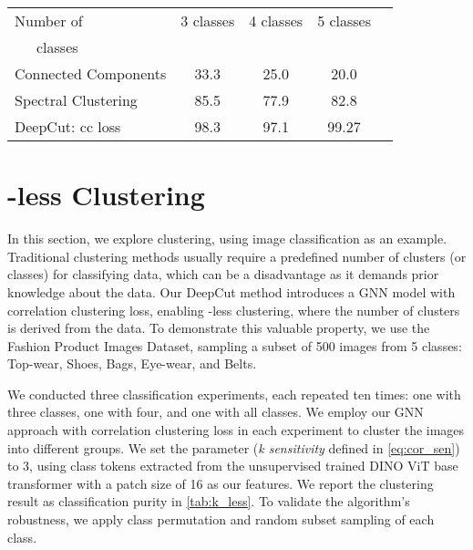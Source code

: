 \documentclass[10pt,twocolumn,letterpaper]{article}
\begin{document}
 \begin{table*}
  \centering
  \begin{tabular}{@{}l c c c c @{}}
    \toprule
    Number  of& 3 classes &4 classes&5 classes&\\
     \ \ \ classes  &                 &   \\

    \midrule
    Connected Components  & 33.3  & 25.0  & 20.0 \\
    Spectral Clustering& 85.5  & 77.9  & 82.8  \\
    DeepCut: cc loss& 98.3   & 97.1  & 99.27   \\

    \bottomrule
  \end{tabular}
  \caption{\textbf{-less clustering.} We apply DeepCut with correlation clustering loss on the Fashion Product Images Dataset\cite{Fashion_dataset}, using a subset of images from 5 classes: Top-wear, Shoes, Bags, Eye-wear, and Belts. We employ our -less method and report the results as classification purity. The experiments are conducted with \emph{k sensitivity = 3} as defined in \cref{eq:cor_sen}. The presented results are the mean and standard deviation (\emph{std}) obtained from multiple experiments.
  }
  \label{tab:k_less}
\end{table*}




\section{-less Clustering}\label{sec:k_les_l}
In this section, we explore clustering, using image classification as an example. Traditional clustering methods usually require a predefined number of clusters (or classes)  for classifying data, which can be a disadvantage as it demands prior knowledge about the data. Our DeepCut method introduces a GNN model with correlation clustering loss, enabling -less clustering, where the number of clusters is derived from the data. To demonstrate this valuable property, we use the Fashion Product Images Dataset\cite{Fashion_dataset}, sampling a subset of 500 images from 5 classes: Top-wear, Shoes, Bags, Eye-wear, and Belts.

We conducted three classification experiments, each repeated ten times: one with three classes, one with four, and one with all classes. We employ our GNN approach with correlation clustering loss in each experiment to cluster the images into different groups. We set the parameter \emph{} (\emph{k sensitivity} defined in \cref{eq:cor_sen}) to 3, using class tokens extracted from the unsupervised trained DINO\cite{caron2021emerging} ViT base transformer with a patch size of 16 as our features. We report the clustering result as classification purity in \cref{tab:k_less}. To validate the algorithm's robustness, we apply class permutation and random subset sampling of each class. 
\end{document}
